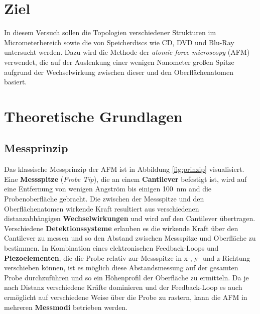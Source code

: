 \section{Ziel}
    In diesem Versuch sollen die Topologien verschiedener Strukturen im Micrometerbereich sowie die von Speicherdiscs wie CD, DVD und Blu-Ray untersucht werden. Dazu wird die Methode der \textit{atomic force
    microscopy} (AFM) verwendet, die auf der Auslenkung einer wenigen Nanometer großen Spitze aufgrund der Wechselwirkung zwischen dieser und den Oberflächenatomen basiert.    
    
\section{Theoretische Grundlagen}
    \subsection{Messprinzip}
        Das klassische Messprinzip der AFM ist in Abbildung \ref{fig:prinzip} visualisiert. Eine \textbf{Messspitze} (\textit{Probe Tip}), die an einem \textbf{Cantilever} befestigt ist, wird auf eine 
        Entfernung von wenigen Angström bis einigen \SI{100}{\nano\metre} and die Probenoberfläche gebracht. Die zwischen der Messspitze und den Oberflächenatomen wirkende Kraft resultiert aus verschiedenen
        distanzabhängigen \textbf{Wechselwirkungen} und wird auf den Cantilever übertragen. Verschiedene \textbf{Detektionssysteme} erlauben es die wirkende Kraft über den Cantilever zu messen und so den 
        Abstand zwischen Messspitze und Oberfläche zu bestimmen. In Kombination eines elektronischen Feedback-Loops und \textbf{Piezoelementen}, die die Probe relativ zur Messspitze in x-, y- und z-Richtung
        verschieben können, ist es möglich diese Abstandsmessung auf der gesamten Probe durchzuführen und so ein Höhenprofil der Oberfläche zu ermitteln. Da je nach Distanz verschiedene Kräfte dominieren und
        der Feedback-Loop es auch ermöglicht auf verschiedene Weise über die Probe zu rastern, kann die AFM in mehreren \textbf{Messmodi} betrieben werden.

        \FloatBarrier

